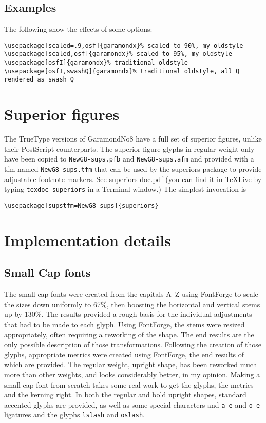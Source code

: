 \documentclass[11pt]{article}
\begin{document}
\subsection{Examples} The following show the effects of some options:

\begin{verbatim}
\usepackage[scaled=.9,osf]{garamondx}% scaled to 90%, my oldstyle
\usepackage[scaled,osf]{garamondx}% scaled to 95%, my oldstyle
\usepackage[osfI]{garamondx}% traditional oldstyle
\usepackage[osfI,swashQ]{garamondx}% traditional oldstyle, all Q rendered as swash Q
\end{verbatim}
\section{Superior figures}
The TrueType versions of GaramondNo8 have a full set of superior figures, unlike their PostScript counterparts. The superior figure glyphs in regular weight only have been copied to \texttt{NewG8-sups.pfb} and \texttt{NewG8-sups.afm} and provided with a tfm named \texttt{NewG8-sups.tfm} that can be used by the \textsf{superiors} package to provide adjustable footnote markers. See \textsf{superiors-doc.pdf} (you can find it in \TeX Live by typing \texttt{texdoc superiors} in a Terminal window.) The simplest invocation is
\begin{verbatim}
\usepackage[supstfm=NewG8-sups]{superiors}
\end{verbatim}

\section{Implementation details}
\subsection{Small Cap fonts}
The small cap fonts were created from the capitals A--Z using FontForge to scale the sizes down uniformly to 67\%, then boosting the horizontal and vertical stems up by 130\%. The results provided a rough basis for the individual adjustments that had to be made to each glyph. Using FontForge, the stems were resized appropriately, often requiring a reworking of the shape. The end results are the only possible description of those transformations. Following the creation of those glyphs,  appropriate metrics were created using FontForge, the end results of which are provided. 
The regular weight, upright shape, has been reworked much more than other weights, and looks considerably better, in my opinion. Making a small cap font from scratch takes some real work to get the glyphs, the metrics and the kerning right. In both the regular and bold upright shapes, standard accented glyphs are provided, as well as some special characters and \verb|a_e| and \verb|o_e| ligatures and the glyphs \texttt{lslash} and \texttt{oslash}.
\end{document}
